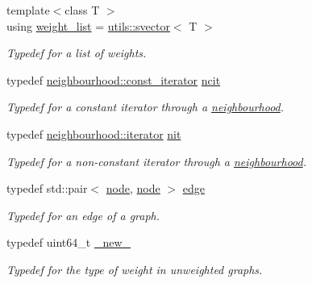 \begin{DoxyCompactItemize}
\mbox{\label{namespacelgraph_a1e0fd5ef0a78b2a92da48adbed265cb6}} 
{\footnotesize template$<$class T $>$ }\\using \hyperlink{namespacelgraph_a1e0fd5ef0a78b2a92da48adbed265cb6}{weight\+\_\+list} = \hyperlink{classlgraph_1_1utils_1_1svector}{utils\+::svector}$<$ T $>$
\begin{DoxyCompactList}\small\item\em Typedef for a list of weights. \end{DoxyCompactList}\item 
\mbox{\label{namespacelgraph_a9db6fe3bec7403f09c603c229beb7e40}} 
typedef \hyperlink{classlgraph_1_1utils_1_1svector_a50774ce617a742e76f3fb8cc0a7a9445}{neighbourhood\+::const\+\_\+iterator} \hyperlink{namespacelgraph_a9db6fe3bec7403f09c603c229beb7e40}{ncit}
\begin{DoxyCompactList}\small\item\em Typedef for a constant iterator through a \hyperlink{namespacelgraph_a052e7766c13f3a43cec0aec8173fdede}{neighbourhood}. \end{DoxyCompactList}\item 
\mbox{\label{namespacelgraph_ad402f72c6d926f6e75ba3523515e0e4a}} 
typedef \hyperlink{classlgraph_1_1utils_1_1svector_a518288794e754e27d2e2274ced4485a6}{neighbourhood\+::iterator} \hyperlink{namespacelgraph_ad402f72c6d926f6e75ba3523515e0e4a}{nit}
\begin{DoxyCompactList}\small\item\em Typedef for a non-\/constant iterator through a \hyperlink{namespacelgraph_a052e7766c13f3a43cec0aec8173fdede}{neighbourhood}. \end{DoxyCompactList}\item 
\mbox{\label{namespacelgraph_a76bd7d50719f03de7a85db259d80d572}} 
typedef std\+::pair$<$ \hyperlink{namespacelgraph_a397169dd66adf725210a30fb7251773e}{node}, \hyperlink{namespacelgraph_a397169dd66adf725210a30fb7251773e}{node} $>$ \hyperlink{namespacelgraph_a76bd7d50719f03de7a85db259d80d572}{edge}
\begin{DoxyCompactList}\small\item\em Typedef for an edge of a graph. \end{DoxyCompactList}\item 
typedef uint64\+\_\+t \hyperlink{namespacelgraph_aa930092705699c3af78e3a4de7880a3f}{\+\_\+new\+\_\+}
\begin{DoxyCompactList}\small\item\em Typedef for the type of weight in unweighted graphs. \end{DoxyCompactList}\end{DoxyCompactItemize}
